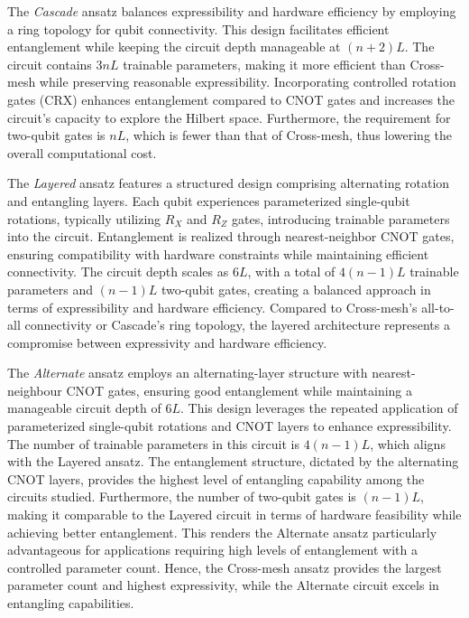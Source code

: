 The \textit{Cascade} ansatz balances expressibility and hardware efficiency by employing a ring topology for qubit connectivity. This design facilitates efficient entanglement while keeping the circuit depth manageable at $(n+2)L$. The circuit contains $3nL$ trainable parameters, making it more efficient than Cross-mesh while preserving reasonable expressibility. Incorporating controlled rotation gates (CRX) enhances entanglement compared to CNOT gates and increases the circuit's capacity to explore the Hilbert space. Furthermore, the requirement for two-qubit gates is $nL$, which is fewer than that of Cross-mesh, thus lowering the overall computational cost.

The \textit{Layered} ansatz features a structured design comprising alternating rotation and entangling layers. Each qubit experiences parameterized single-qubit rotations, typically utilizing $R_X$ and $R_Z$ gates, introducing trainable parameters into the circuit. Entanglement is realized through nearest-neighbor CNOT gates, ensuring compatibility with hardware constraints while maintaining efficient connectivity. The circuit depth scales as $6L$, with a total of $4(n-1)L$ trainable parameters and $(n-1)L$ two-qubit gates, creating a balanced approach in terms of expressibility and hardware efficiency. Compared to Cross-mesh's all-to-all connectivity or Cascade's ring topology, the layered architecture represents a compromise between expressivity and hardware efficiency. 

The \textit{Alternate} ansatz employs an alternating-layer structure with nearest-neighbour CNOT gates, ensuring good entanglement while maintaining a manageable circuit depth of $6L$. This design leverages the repeated application of parameterized single-qubit rotations and CNOT layers to enhance expressibility. The number of trainable parameters in this circuit is $4(n-1)L$, which aligns with the Layered ansatz. The entanglement structure, dictated by the alternating CNOT layers, provides the highest level of entangling capability among the circuits studied. Furthermore, the number of two-qubit gates is $(n-1)L$, making it comparable to the Layered circuit in terms of hardware feasibility while achieving better entanglement. This renders the Alternate ansatz particularly advantageous for applications requiring high levels of entanglement with a controlled parameter count.
%
Hence, the Cross-mesh ansatz provides the largest parameter count and highest expressivity, while the Alternate circuit excels in entangling capabilities.


